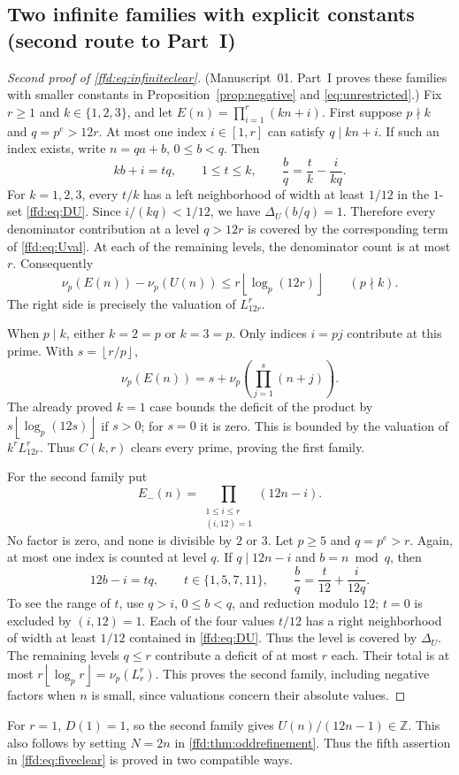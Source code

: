 \documentclass[11pt]{article}
\theoremstyle{definition}
\theoremstyle{remark}
\newcommand{\Z}{\mathbb Z}
\newcommand{\floor}[1]{\left\lfloor #1\right\rfloor}
\newcommand{\nup}{\nu_p}
\begin{document}
\subsection{Two infinite families with explicit constants (second route to Part~I)}\label{ffd:sec:families}
\begin{proof}[Second proof of \eqref{ffd:eq:infiniteclear}]
(Manuscript~01. Part~I proves these families with smaller constants in
Proposition~\ref{prop:negative} and \eqref{eq:unrestricted}.)
Fix $r\ge1$ and $k\in\{1,2,3\}$, and let
$E(n)=\prod_{i=1}^r(kn+i)$. First suppose $p\nmid k$ and $q=p^e>12r$.
At most one index $i\in[1,r]$ can satisfy $q\mid kn+i$.
If such an index exists, write $n=qa+b$, $0\le b<q$. Then
\[
 kb+i=tq,\qquad 1\le t\le k,\qquad
 \frac bq=\frac tk-\frac{i}{kq}.
\]
For $k=1,2,3$, every $t/k$ has a left neighborhood of width at least $1/12$
in the $1$-set \eqref{ffd:eq:DU}. Since $i/(kq)<1/12$, we have
$\Delta_U(b/q)=1$. Therefore every denominator contribution at a level
$q>12r$ is covered by the corresponding term of \eqref{ffd:eq:Uval}.
At each of the remaining levels, the denominator count is at most $r$.
Consequently
\begin{equation}
 \nup(E(n))-\nup(U(n))\le r\floor{\log_p(12r)}\qquad(p\nmid k).
 \label{ffd:eq:smalllevelbound}
\end{equation}
The right side is precisely the valuation of $L_{12r}^r$.

When $p\mid k$, either $k=2=p$ or $k=3=p$. Only indices $i=pj$ contribute
at this prime. With $s=\floor{r/p}$,
\[
 \nup(E(n))=s+\nup\left(\prod_{j=1}^{s}(n+j)\right).
\]
The already proved $k=1$ case bounds the deficit of the product by
$s\floor{\log_p(12s)}$ if $s>0$; for $s=0$ it is zero. This is bounded by
the valuation of $k^rL_{12r}^r$. Thus $C(k,r)$ clears every prime, proving
the first family.

For the second family put
\[
 E_-(n)=\prod_{\substack{1\le i\le r\\(i,12)=1}}(12n-i).
\]
No factor is zero, and none is divisible by $2$ or $3$. Let $p\ge5$ and
$q=p^e>r$. Again, at most one index is counted at level $q$. If
$q\mid12n-i$ and $b=n\bmod q$, then
\[
 12b-i=tq,\qquad t\in\{1,5,7,11\},\qquad
 \frac bq=\frac{t}{12}+\frac{i}{12q}.
\]
To see the range of $t$, use $q>i$, $0\le b<q$, and reduction modulo $12$;
$t=0$ is excluded by $(i,12)=1$. Each of the four values $t/12$ has a right
neighborhood of width at least $1/12$ contained in \eqref{ffd:eq:DU}. Thus the
level is covered by $\Delta_U$. The remaining levels $q\le r$ contribute a
deficit of at most $r$ each. Their total is at most
$r\floor{\log_p r}=\nup(L_r^r)$. This proves the second family, including
negative factors when $n$ is small, since valuations concern their absolute
values.
\end{proof}
For $r=1$, $D(1)=1$, so the second family gives $U(n)/(12n-1)\in\Z$.
This also follows by setting $N=2n$ in \cref{ffd:thm:oddrefinement}. Thus the fifth
assertion in \eqref{ffd:eq:fiveclear} is proved in two compatible ways.
\end{document}
